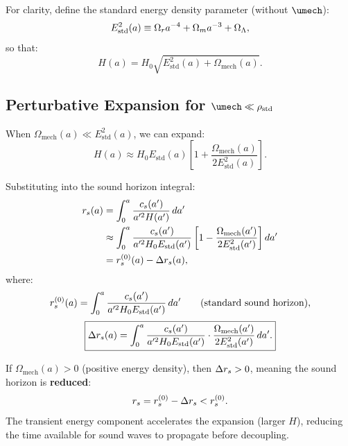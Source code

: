 For clarity, define the standard energy density parameter (without $\umech$):
\begin{equation}
E_{\mathrm{std}}^2(a) \equiv \Omega_r a^{-4} + \Omega_m a^{-3} + \Omega_\Lambda,
\end{equation}
so that:
\begin{equation}
H(a) = H_0 \sqrt{E_{\mathrm{std}}^2(a) + \Omega_{\mathrm{mech}}(a)}.
\end{equation}

\subsection{Perturbative Expansion for $\umech \ll \rho_{\mathrm{std}}$}
\label{sec:perturbative_expansion}

When $\Omega_{\mathrm{mech}}(a) \ll E_{\mathrm{std}}^2(a)$, we can expand:
\begin{equation}
\label{eq:H_expansion}
H(a) \approx H_0 E_{\mathrm{std}}(a) \left[ 1 + \frac{\Omega_{\mathrm{mech}}(a)}{2 E_{\mathrm{std}}^2(a)} \right].
\end{equation}

Substituting into the sound horizon integral:
\begin{align}
r_s(a) &= \int_0^a \frac{c_s(a')}{a'^2 H(a')} \, da' \notag \\
&\approx \int_0^a \frac{c_s(a')}{a'^2 H_0 E_{\mathrm{std}}(a')} \left[ 1 - \frac{\Omega_{\mathrm{mech}}(a')}{2 E_{\mathrm{std}}^2(a')} \right] da' \notag \\
&= r_s^{(0)}(a) - \Delta r_s(a),
\end{align}
where:
\begin{equation}
\label{eq:rs0}
r_s^{(0)}(a) = \int_0^a \frac{c_s(a')}{a'^2 H_0 E_{\mathrm{std}}(a')} \, da' \qquad \text{(standard sound horizon)},
\end{equation}
\begin{equation}
\label{eq:Delta_rs}
\boxed{\Delta r_s(a) = \int_0^a \frac{c_s(a')}{a'^2 H_0 E_{\mathrm{std}}(a')} \cdot \frac{\Omega_{\mathrm{mech}}(a')}{2 E_{\mathrm{std}}^2(a')} \, da'.}
\end{equation}

\begin{proposition}
\label{prop:rs_reduction}
If $\Omega_{\mathrm{mech}}(a) > 0$ (positive energy density), then $\Delta r_s > 0$, meaning the sound horizon is \textbf{reduced}:
\begin{equation}
r_s = r_s^{(0)} - \Delta r_s < r_s^{(0)}.
\end{equation}
The transient energy component accelerates the expansion (larger $H$), reducing the time available for sound waves to propagate before decoupling.
\end{proposition}

